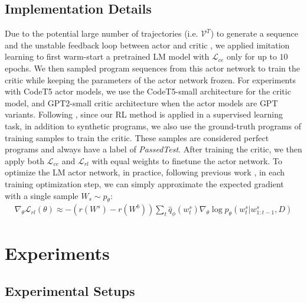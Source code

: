 \documentclass{article}
\begin{document}
\subsection{Implementation Details}
Due to the potential large number of trajectories (i.e. $\mathcal{V}^{T}$) to generate a sequence and the  unstable feedback loop between actor and critic \citep{lillicrap2015continuous, wang2018video}, we applied imitation learning to first warm-start a pretrained LM model with $\mathcal{L}_{ce}$ only for up to $10$ epochs. 
We then sampled program sequences from this actor network to train the critic while keeping the parameters of the actor network frozen. For experiments with CodeT5 actor models, we use the CodeT5-small architecture for the critic model, and GPT2-small critic architecture when the actor models are GPT variants. 
Following \citep{bahdanau2016actor}, since our RL method is applied in a supervised learning task, in addition to synthetic programs, we also use the ground-truth programs of training samples to train the critic.
These samples are considered perfect programs and always have a label of \emph{PassedTest}. 
After training the critic, we then apply both $\mathcal{L}_{ce}$ and $\mathcal{L}_{rl}$ with equal weights to finetune the actor network. To optimize the LM actor network, in practice, following previous work \citep{bahdanau2016actor, rennie2017self, wang2018video}, 
in each training optimization step, we can simply approximate the expected gradient with a single sample $W_s \sim p_\theta$:
\begin{align}
    \nabla_\theta \mathcal{L}_{rl}(\theta) \approx - (r(W^s)-r(W^b))  \sum_t \hat{q}_\phi(w^s_t) \nabla_\theta \log p_\theta(w^s_t|w^s_{1:t-1}, D)
\end{align}

 
\section{Experiments}
\label{sec:experiments}
\subsection{Experimental Setups}
\end{document}
